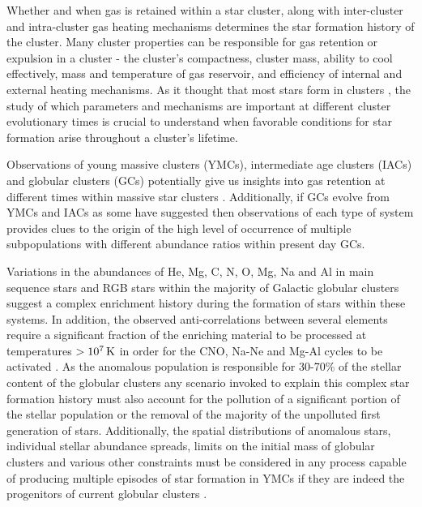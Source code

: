 \documentclass[fleqn,usenatbib]{mnras}
\begin{document}
 Whether and when gas is retained within a star cluster, along with inter-cluster and intra-cluster gas heating mechanisms determines the star formation history of the cluster.
 Many cluster properties can be responsible for gas retention or expulsion in a cluster - the cluster's compactness, cluster mass, ability to cool effectively, mass and temperature of gas reservoir, and efficiency of internal and external heating mechanisms.  
 As it thought that most stars form in clusters \citep[e.g.][]{lada2003}, the study of which parameters and mechanisms are important at different cluster evolutionary times is crucial to understand when favorable conditions for star formation arise throughout a cluster's lifetime.

 Observations of young massive clusters (YMCs), intermediate age clusters (IACs) and globular clusters (GCs) potentially give us insights into gas retention at different times within massive star clusters \citep[e.g.][]{bastian2017}.
 Additionally, if GCs evolve from YMCs and IACs as some have suggested \citep{longmore2014,krui2015} then observations of each type of system provides clues to the origin of the high level of occurrence of multiple subpopulations with different abundance ratios within present day GCs.

 Variations in the abundances of He, Mg, C, N, O, Mg, Na and Al in main sequence stars \citep{gratton2001,briley2002,cohen2002,cannon1998,pancino2010b} and RGB stars \citep{sneden2004} within the majority of Galactic globular clusters suggest a complex enrichment history during the formation of stars within these systems.
 In addition, the observed anti-correlations between several elements \citep[Na-O and Mg-Al;][]{kraft1993,ivans1999,carretta2006b,carretta2009b,conroy2012} require a significant fraction of the enriching material to be processed at temperatures $> 10^7 \, {\rm K}$ in order for the CNO, Na-Ne and Mg-Al cycles to be activated \citep{karakas2007,ventura2008b}.
 As the anomalous population is responsible for 30-70\% of the stellar content of the globular clusters \citep[e.g.][]{carretta2009} any scenario invoked to explain this complex star formation history must also account for the pollution of a significant portion of the stellar population or the removal of the majority of the unpolluted first generation of stars.
 Additionally, the spatial distributions of anomalous stars, individual stellar abundance spreads, limits on the initial mass of globular clusters and various other constraints must be considered in any process capable of producing multiple episodes of star formation in YMCs if they are indeed the progenitors of current globular clusters \citep{bastian2013b,krui2015}.
\end{document}
